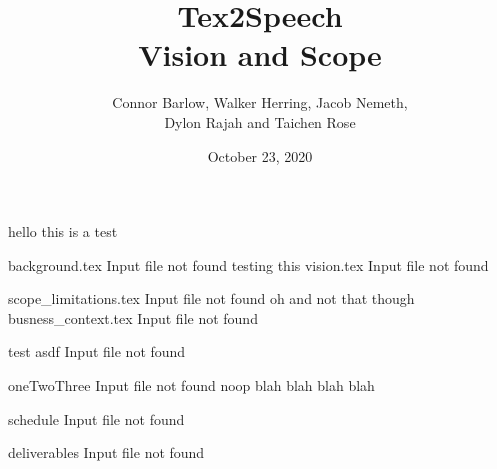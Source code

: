 \documentclass[letterpaper,12pt]{article}
\title{Tex2Speech\\Vision and Scope}
\author{Connor Barlow, Walker Herring, Jacob Nemeth,\\Dylon Rajah and Taichen Rose}
\date{October 23, 2020}
\begin{document}
\maketitle

hello this is a test

background.tex Input file not found 
  testing this vision.tex Input file not found 

scope_limitations.tex Input file not found 
 oh and not that though busness_context.tex Input file not found 

test asdf Input file not found 

oneTwoThree Input file not found 
 noop
blah blah
blah blah

schedule Input file not found 

deliverables Input file not found 

\end{document}
